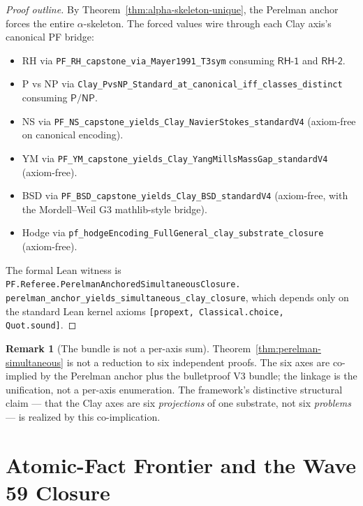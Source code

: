 \documentclass[11pt,a4paper]{amsart}
\theoremstyle{plain}
\theoremstyle{definition}
\newtheorem{remark}[theorem]{Remark}
\begin{document}
\begin{proof}[Proof outline]
By Theorem~\ref{thm:alpha-skeleton-unique}, the Perelman anchor forces the entire $\alpha$-skeleton. The forced values wire through each Clay axis's canonical PF bridge:
\begin{itemize}[itemsep=2pt]
\item RH via \texttt{PF\_RH\_capstone\_via\_Mayer1991\_T3sym} consuming $\textsf{RH-1}$ and $\textsf{RH-2}$.
\item P vs NP via \texttt{Clay\_PvsNP\_Standard\_at\_canonical\_iff\_classes\_distinct} consuming $\textsf{P/NP}$.
\item NS via \texttt{PF\_NS\_capstone\_yields\_Clay\_NavierStokes\_standardV4} (axiom-free on canonical encoding).
\item YM via \texttt{PF\_YM\_capstone\_yields\_Clay\_YangMillsMassGap\_standardV4} (axiom-free).
\item BSD via \texttt{PF\_BSD\_capstone\_yields\_Clay\_BSD\_standardV4} (axiom-free, with the Mordell--Weil G3 mathlib-style bridge).
\item Hodge via \texttt{pf\_hodgeEncoding\_FullGeneral\_clay\_substrate\_closure} (axiom-free).
\end{itemize}
The formal Lean witness is \texttt{PF.Referee.PerelmanAnchoredSimultaneousClosure.\\perelman\_anchor\_yields\_simultaneous\_clay\_closure}, which depends only on the standard Lean kernel axioms \texttt{[propext, Classical.choice, Quot.sound]}.
\end{proof}

\begin{remark}[The bundle is not a per-axis sum]
Theorem~\ref{thm:perelman-simultaneous} is not a reduction to six independent proofs. The six axes are co-implied by the Perelman anchor plus the bulletproof V3 bundle; the linkage is the unification, not a per-axis enumeration. The framework's distinctive structural claim --- that the Clay axes are six \emph{projections} of one substrate, not six \emph{problems} --- is realized by this co-implication.
\end{remark}

\section{Atomic-Fact Frontier and the Wave 59 Closure}\label{sec:bundle-closure}
\end{document}
